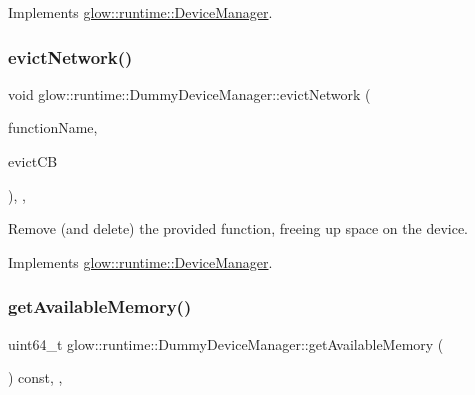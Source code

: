 Implements \hyperlink{classglow_1_1runtime_1_1_device_manager_a9bbf9a88f8bf9ddc0ce63590580aa91f}{glow\+::runtime\+::\+Device\+Manager}.

\mbox{\label{classglow_1_1runtime_1_1_dummy_device_manager_a69a52700a23ae64f2c9db09e1e32c038}} 
\subsubsection{\texorpdfstring{evict\+Network()}{evictNetwork()}}
{\footnotesize\ttfamily void glow\+::runtime\+::\+Dummy\+Device\+Manager\+::evict\+Network (\begin{DoxyParamCaption}\item[{std\+::string}]{function\+Name,  }\item[{Evict\+Function\+C\+B\+Ty}]{evict\+CB }\end{DoxyParamCaption})\hspace{0.3cm}{\ttfamily [inline]}, {\ttfamily [override]}, {\ttfamily [virtual]}}

Remove (and delete) the provided function, freeing up space on the device. 

Implements \hyperlink{classglow_1_1runtime_1_1_device_manager_a147c76a007db17659c1962c1fa864f9a}{glow\+::runtime\+::\+Device\+Manager}.

\mbox{\label{classglow_1_1runtime_1_1_dummy_device_manager_a96ef72c763a1932e1482c29b4eea486b}} 
\subsubsection{\texorpdfstring{get\+Available\+Memory()}{getAvailableMemory()}}
{\footnotesize\ttfamily uint64\+\_\+t glow\+::runtime\+::\+Dummy\+Device\+Manager\+::get\+Available\+Memory (\begin{DoxyParamCaption}{ }\end{DoxyParamCaption}) const\hspace{0.3cm}{\ttfamily [inline]}, {\ttfamily [override]}, {\ttfamily [virtual]}}

